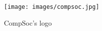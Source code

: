 \begin{figure}
   \texttt{[image: images/compsoc.jpg]}
   \caption{CompSoc's logo}
   \label{fig:logo}
\end{figure}
